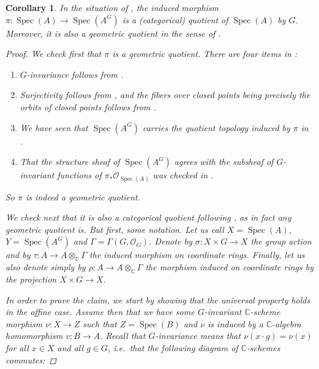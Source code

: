 \documentclass[12pt,a4paper]{amsart}
\theoremstyle{plain}
\newtheorem{cor}[thm]{Corollary}
\theoremstyle{definition}
\theoremstyle{remark}
\begin{document}
\begin{cor}\label{cor:quotient}
  In the situation of , the induced morphism $\pi \colon \operatorname{Spec}(A) \to \operatorname{Spec}(A^{G})$ is a (categorical) quotient of $\operatorname{Spec}(A)$ by $G$.
  Moreover, it is also a \textit{geometric quotient} in the sense of \cite[Definition 0.6]{mfk94}.

  \begin{proof}
    We check first that $\pi$ is a geometric quotient.
    There are four items in \cite[Definition 0.6]{mfk94}:
    \begin{enumerate}[label=\roman*)]
      \item $G$-invariance follows from .
      \item Surjectivity follows from , and the fibers over closed points being precisely the orbits of closed points follows from .
      \item We have seen that $\operatorname{Spec}(A^{G})$ carries the quotient topology induced by $\pi$ in .
      \item That the structure sheaf of $\operatorname{Spec}(A^{G})$ agrees with the subsheaf of $G$-invariant functions of $\pi_{*}\mathscr{O}_{\operatorname{Spec}(A)}$ was checked in .
    \end{enumerate}
    So $\pi$ is indeed a geometric quotient.
    
    We check next that it is also a categorical quotient following \cite[Porposition 0.1]{mfk94}, as in fact any geometric quotient is.
    But first, some notation.
    Let us call $X = \operatorname{Spec}(A)$, $Y = \operatorname{Spec}(A^{G})$ and $\Gamma = \Gamma(G, \mathscr{O}_{G})$.
    Denote by $\sigma \colon X \times G \to X$ the group action and by $\tau \colon A \to A \otimes_{\mathbb{C}} \Gamma$ the induced morphism on coordinate rings.
    Finally, let us also denote simply by $\rho \colon A \to A \otimes_{\mathbb{C}} \Gamma$ the morphism induced on coordinate rings by the projection $X \times G \to X$.

    In order to prove the claim, we start by showing that the universal property holds in the affine case.
    Assume then that we have some $G$-invariant $\mathbb{C}$-scheme morphism $\nu \colon X \to Z$ such that $Z = \operatorname{Spec}(B)$ and $\nu$ is induced by a $\mathbb{C}$-algebra homomorphism $v \colon B \to A$.
    Recall that $G$-invariance means that $\nu(x \cdot g) = \nu(x)$ for all $x \in X$ and all $g \in G$, i.e.~that the following diagram of $\mathbb{C}$-schemes commutes:


\end{proof}
\end{cor}
\end{document}
